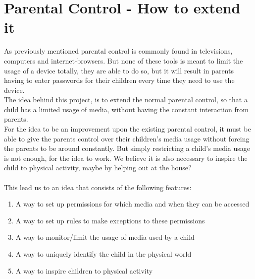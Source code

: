 \section{Parental Control - How to extend it}
As previously mentioned parental control is commonly found in televisions, computers and internet-browsers. But none of these tools is meant to limit the usage of a device totally, they are able to do so, but it will result in parents having to enter passwords for their children every time they need to use the device.\\
The idea behind this project, is to extend the normal parental control, so that a child has a limited usage of media, without having the constant interaction from parents. \\
For the idea to be an improvement upon the existing parental control, it must be able to give the parents control over their children's media usage without forcing the parents to be around constantly. But simply restricting a child's media usage is not enough, for the idea to work. We believe it is also necessary to inspire the child to physical activity, maybe by helping out at the house?\\
\\
This lead us to an idea that consists of the following features:

\begin{enumerate}
	\item A way to set up permissions for which media and when they can be accessed
	\item A way to set up rules to make exceptions to these permissions
	\item A way to monitor/limit the usage of media used by a child
	\item A way to uniquely identify the child in the physical world
	\item A way to inspire children to physical activity
\end{enumerate}

